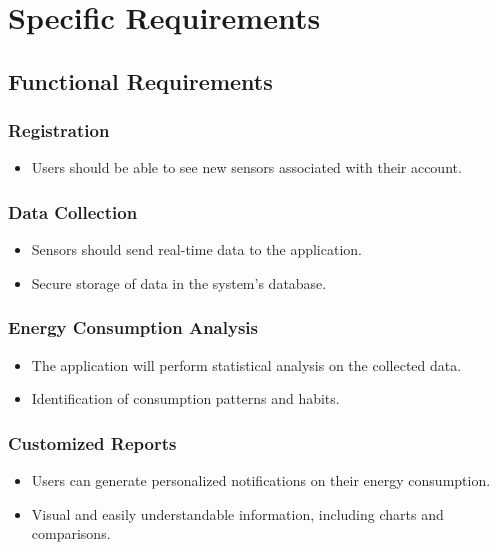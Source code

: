 \documentclass[conference]{IEEEtran}
\begin{document}
\section{Specific Requirements}

\subsection{Functional Requirements}

\subsubsection{Registration}

\begin{itemize}
    \item Users should be able to see new sensors associated with their account.
\end{itemize}

\subsubsection{Data Collection}

\begin{itemize}
    \item Sensors should send real-time data to the application.
    \item Secure storage of data in the system's database.
\end{itemize}

\subsubsection{Energy Consumption Analysis}

\begin{itemize}
    \item The application will perform statistical analysis on the collected data.
    \item Identification of consumption patterns and habits.
\end{itemize}

\subsubsection{Customized Reports}

\begin{itemize}
    \item Users can generate personalized notifications  on their energy consumption.
    \item Visual and easily understandable information, including charts and comparisons.
\end{itemize}
\end{document}
